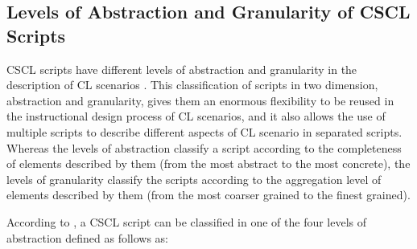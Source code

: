 \subsection{Levels of Abstraction and Granularity of CSCL Scripts}
\label{sec:level-of-abstraction-and-granularity-of-cscl-scripts}

CSCL scripts have different levels of abstraction and granularity in the description of CL scenarios \cite{Dillenbourg2002, DillenbourgJermann2007, Villasclaras-FernandezIsotaniHayashiMizoguchi2009}. This classification of scripts in two dimension, abstraction and granularity, gives them an enormous flexibility to be reused in the instructional design process of CL scenarios, and it also allows the use of multiple scripts to describe different aspects of CL scenario in separated scripts. Whereas the levels of abstraction classify a script according to the completeness of elements described by them (from the most abstract to the most concrete), the levels of granularity classify the scripts according to the aggregation level of elements described by them (from the most coarser grained to the finest grained).

According to , a CSCL script can be classified in one of the four levels of abstraction defined as follows as:


